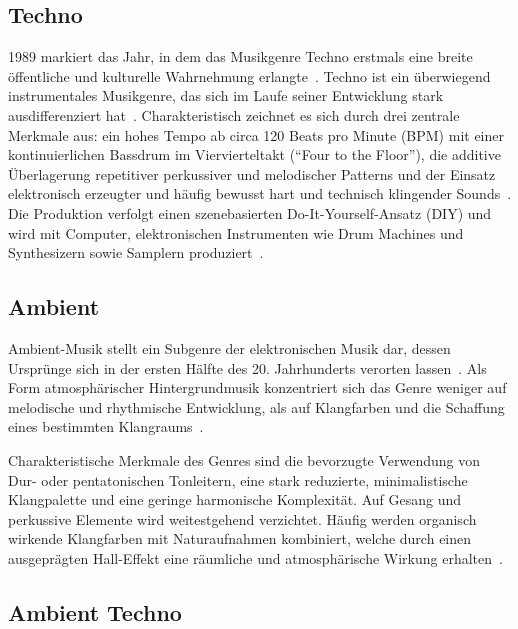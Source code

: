 \documentclass[11pt]{article}
\begin{document}
\subsection{Techno}

1989 markiert das Jahr, in dem das Musikgenre Techno erstmals eine breite öffentliche und kulturelle Wahrnehmung erlangte~\cite{ischebeck_subjekt_2025}. Techno ist ein überwiegend instrumentales Musikgenre, das sich im Laufe seiner Entwicklung stark ausdifferenziert hat~\cite{hecken_techno_2017}. Charakteristisch zeichnet es sich durch drei zentrale Merkmale aus: ein hohes Tempo ab circa 120 Beats pro Minute (BPM) mit einer kontinuierlichen Bassdrum im Viervierteltakt (\enquote{Four to the Floor}), die additive Überlagerung repetitiver perkussiver und melodischer Patterns und der Einsatz elektronisch erzeugter und häufig bewusst hart und technisch klingender Sounds~\cite{hecken_techno_2017}. Die Produktion verfolgt einen szenebasierten Do-It-Yourself-Ansatz (DIY) und wird mit Computer, elektronischen Instrumenten wie Drum Machines und Synthesizern sowie Samplern produziert~\cite{hecken_techno_2017}.

\subsection{Ambient}
\label{sec:ambient}

Ambient-Musik stellt ein Subgenre der elektronischen Musik dar, dessen Ursprünge sich in der ersten Hälfte des 20. Jahrhunderts verorten lassen~\cite{velescu_ambient_2015}.
Als Form atmosphärischer Hintergrundmusik konzentriert sich das Genre weniger auf melodische und rhythmische Entwicklung, als auf Klangfarben und die Schaffung eines bestimmten Klangraums~\cite{velescu_ambient_2015}.

Charakteristische Merkmale des Genres sind die bevorzugte Verwendung von Dur- oder pentatonischen Tonleitern, eine stark reduzierte, minimalistische Klangpalette und eine geringe harmonische Komplexität. Auf Gesang und perkussive Elemente wird weitestgehend verzichtet. Häufig werden organisch wirkende Klangfarben mit Naturaufnahmen kombiniert, welche durch einen ausgeprägten Hall-Effekt eine räumliche und atmosphärische Wirkung erhalten~\cite{burdon_immunological_2023}.

\subsection{Ambient Techno}
\label{sec:ambient-techno}
\end{document}
